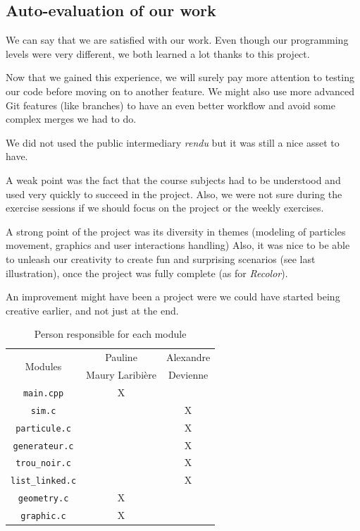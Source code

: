 \documentclass[a4paper]{article} %
\begin{document}
\begin{multicols*}{2}
\subsection{Auto-evaluation of our work}
We can say that we are satisfied with our work.
Even though our programming levels were very different,
we both learned a lot thanks to this project.

Now that we gained this experience, we will surely pay more attention to testing our code
before moving on to another feature.
We might also use more advanced Git features (like branches) to have an even better workflow and
avoid some complex merges we had to do.

We did not used the public intermediary \emph{rendu} but it was still a nice asset to have.

A weak point was the fact that the course subjects had to be understood
and used very quickly to succeed in the project.
Also, we were not sure during the exercise sessions if we should focus
on the project or the weekly exercises.

A strong point of the project was its diversity in themes (modeling of particles movement, graphics and user interactions handling)
Also, it was nice to be able to unleash our creativity to create fun and surprising scenarios (see last illustration),
once the project was fully complete (as for \emph{Recolor}).

An improvement might have been a project were we could have started being creative earlier, and not just at the end.

\begin{table}[H]
\begin{center}
\begin{tabular}{|c|c|c|}
\hline
\multicolumn{1}{|c|}{\multirow{2}{*}{Modules}} & Pauline & Alexandre \\
 & Maury Laribière &  Devienne\\
\hline
\hline
\texttt{main.cpp} &  X &\\
\hline
\texttt{sim.c} & &X\\
\hline
\texttt{particule.c} & & X\\
\hline
\texttt{generateur.c} & & X\\
\hline
\texttt{trou\_noir.c} & & X\\
\hline
\texttt{list\_linked.c} & &X\\
\hline
\texttt{geometry.c} & X&\\
\hline
\texttt{graphic.c} & X&\\
\hline
\end{tabular}
\end{center}
\caption{Person responsible for each module}
\label{tab-module}
\end{table}


\end{multicols*}
\end{document}

